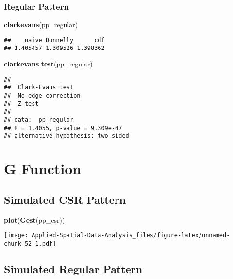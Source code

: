\documentclass[
]{book}
\newenvironment{Shaded}{\begin{snugshade}}{\end{snugshade}}
\newcommand{\KeywordTok}[1]{\textcolor[rgb]{0.13,0.29,0.53}{\textbf{#1}}}
\newcommand{\NormalTok}[1]{#1}
\begin{document}
\hypertarget{regular-pattern-2}{%
\subsubsection{Regular Pattern}\label{regular-pattern-2}}

\begin{Shaded}
\begin{Highlighting}[]
\KeywordTok{clarkevans}\NormalTok{(pp_regular)}
\end{Highlighting}
\end{Shaded}

\begin{verbatim}
##    naive Donnelly      cdf 
## 1.405457 1.309526 1.398362
\end{verbatim}

\begin{Shaded}
\begin{Highlighting}[]
\KeywordTok{clarkevans.test}\NormalTok{(pp_regular)}
\end{Highlighting}
\end{Shaded}

\begin{verbatim}
## 
## 	Clark-Evans test
## 	No edge correction
## 	Z-test
## 
## data:  pp_regular
## R = 1.4055, p-value = 9.309e-07
## alternative hypothesis: two-sided
\end{verbatim}

\hypertarget{g-function}{%
\section{G Function}\label{g-function}}

\hypertarget{simulated-csr-pattern-2}{%
\subsection{Simulated CSR Pattern}\label{simulated-csr-pattern-2}}

\begin{Shaded}
\begin{Highlighting}[]
\KeywordTok{plot}\NormalTok{(}\KeywordTok{Gest}\NormalTok{(pp_csr))}
\end{Highlighting}
\end{Shaded}

\texttt{[image: Applied-Spatial-Data-Analysis\_files/figure-latex/unnamed-chunk-52-1.pdf]}

\hypertarget{simulated-regular-pattern-2}{%
\subsection{Simulated Regular Pattern}\label{simulated-regular-pattern-2}}
\end{document}
